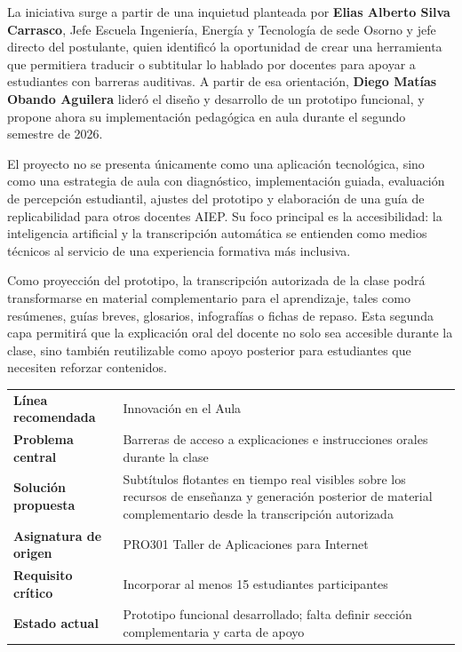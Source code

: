 \documentclass[11pt,letterpaper]{article}
\begin{document}
La iniciativa surge a partir de una inquietud planteada por \textbf{Elias Alberto Silva Carrasco}, Jefe Escuela Ingeniería, Energía y Tecnología de sede Osorno y jefe directo del postulante, quien identificó la oportunidad de crear una herramienta que permitiera traducir o subtitular lo hablado por docentes para apoyar a estudiantes con barreras auditivas. A partir de esa orientación, \textbf{Diego Matías Obando Aguilera} lideró el diseño y desarrollo de un prototipo funcional, y propone ahora su implementación pedagógica en aula durante el segundo semestre de 2026.

El proyecto no se presenta únicamente como una aplicación tecnológica, sino como una estrategia de aula con diagnóstico, implementación guiada, evaluación de percepción estudiantil, ajustes del prototipo y elaboración de una guía de replicabilidad para otros docentes AIEP. Su foco principal es la accesibilidad: la inteligencia artificial y la transcripción automática se entienden como medios técnicos al servicio de una experiencia formativa más inclusiva.

Como proyección del prototipo, la transcripción autorizada de la clase podrá transformarse en material complementario para el aprendizaje, tales como resúmenes, guías breves, glosarios, infografías o fichas de repaso. Esta segunda capa permitirá que la explicación oral del docente no solo sea accesible durante la clase, sino también reutilizable como apoyo posterior para estudiantes que necesiten reforzar contenidos.

\begin{center}
\begin{tabularx}{0.95\textwidth}{>{\bfseries}p{4cm}X}
\toprule
Línea recomendada & Innovación en el Aula \\
Problema central & Barreras de acceso a explicaciones e instrucciones orales durante la clase \\
Solución propuesta & Subtítulos flotantes en tiempo real visibles sobre los recursos de enseñanza y generación posterior de material complementario desde la transcripción autorizada \\
Asignatura de origen & PRO301 Taller de Aplicaciones para Internet \\
Requisito crítico & Incorporar al menos 15 estudiantes participantes \\
Estado actual & Prototipo funcional desarrollado; falta definir sección complementaria y carta de apoyo \\
\bottomrule
\end{tabularx}
\end{center}
\end{document}
